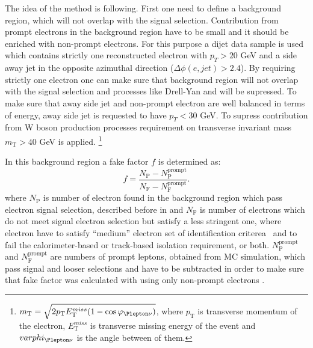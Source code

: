 The idea of the method is following. 
First one need to define a background region, which will not overlap with the signal selection.
Contribution from prompt electrons in the background region have to be small and it should be enriched with
non-prompt electrons.
For this purpose a dijet data sample is used which contains strictly one reconstructed electron with $p_T > 20$ GeV
and a side away jet in the opposite azimuthal direction ($\Delta \phi (e,jet) > 2.4$).
By requiring strictly one electron one can make sure that background region will not overlap with the signal selection and processes like Drell-Yan and \ttbar will be supressed.
To make sure that away side jet and non-prompt electron are well balanced in terms of energy, away side jet is
requested to have $p_T < 30$ GeV.
To supress contribution from W boson production processes requirement on transverse invariant mass 
$m_\mathrm{T} > 40$ GeV is applied.
\footnote{$m_\mathrm{T} = \sqrt{2 p_\mathrm{T} E_\mathrm{T}^{miss} (1-\cos\varphi_{\Plepton\nu})}$, where
$p_\mathrm{T}$ is transverse momentum of the electron, $E_\mathrm{T}^{miss}$ is transverse missing energy of the event
and $varphi_{\Plepton\nu}$ is the angle between of them.}

In this background region a fake factor $f$ is determined as:
\begin{equation}
f = \frac{N_{\mathrm{P}} - N_{\mathrm{P}}^{\mathrm{prompt}}}{N_{\mathrm{F}}  - N_{\mathrm{F}}^{\mathrm{prompt}}}.
\label{eq:fakefactor}
\end{equation}
where $N_{\mathrm{P}}$ is number of electron found in the background region which pass electron signal selection,
described before in  and $N_{\mathrm{F}}$ is number of electrons which do not meet 
signal electron selection but satisfy a less stringent one, where electron have to satisfy ``medium'' electron set of identification criterea~\cite{electron_tight} and to fail the calorimeter-based or track-based isolation requirement,
or both.
$N_{\mathrm{P}}^{\mathrm{prompt}}$ and $N_{\mathrm{F}}^{\mathrm{prompt}}$ are numbers of prompt
leptons, obtained from MC simulation, which pass signal and looser selections and have to be subtracted in order to make sure that fake factor was calculated with using only non-prompt electrons .

